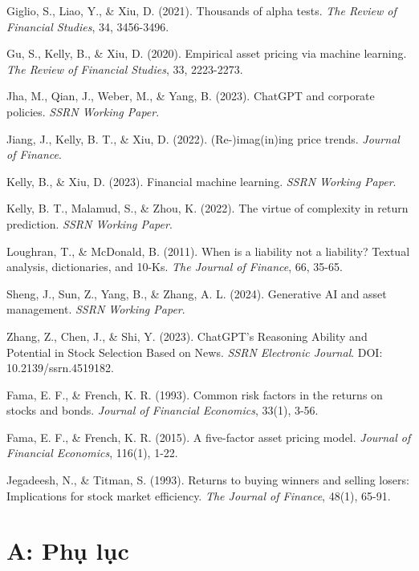 \documentclass[a4paper,12pt]{article}
\begin{document}
\begin{thebibliography}{99}
Giglio, S., Liao, Y., \& Xiu, D. (2021). Thousands of alpha tests. \textit{The Review of Financial Studies}, 34, 3456-3496.

Gu, S., Kelly, B., \& Xiu, D. (2020). Empirical asset pricing via machine learning. \textit{The Review of Financial Studies}, 33, 2223-2273.

Jha, M., Qian, J., Weber, M., \& Yang, B. (2023). ChatGPT and corporate policies. \textit{SSRN Working Paper}.

Jiang, J., Kelly, B. T., \& Xiu, D. (2022). (Re-)imag(in)ing price trends. \textit{Journal of Finance}.

Kelly, B., \& Xiu, D. (2023). Financial machine learning. \textit{SSRN Working Paper}.

Kelly, B. T., Malamud, S., \& Zhou, K. (2022). The virtue of complexity in return prediction. \textit{SSRN Working Paper}.

Loughran, T., \& McDonald, B. (2011). When is a liability not a liability? Textual analysis, dictionaries, and 10-Ks. \textit{The Journal of Finance}, 66, 35-65.

Sheng, J., Sun, Z., Yang, B., \& Zhang, A. L. (2024). Generative AI and asset management. \textit{SSRN Working Paper}.

Zhang, Z., Chen, J., \& Shi, Y. (2023). ChatGPT's Reasoning Ability and Potential in Stock Selection Based on News. \textit{SSRN Electronic Journal}. DOI: 10.2139/ssrn.4519182.

Fama, E. F., \& French, K. R. (1993). Common risk factors in the returns on stocks and bonds. \textit{Journal of Financial Economics}, 33(1), 3-56.

Fama, E. F., \& French, K. R. (2015). A five-factor asset pricing model. \textit{Journal of Financial Economics}, 116(1), 1-22.

Jegadeesh, N., \& Titman, S. (1993). Returns to buying winners and selling losers: Implications for stock market efficiency. \textit{The Journal of Finance}, 48(1), 65-91.

\end{thebibliography}
\section*{A: Phụ lục}
\end{document}
